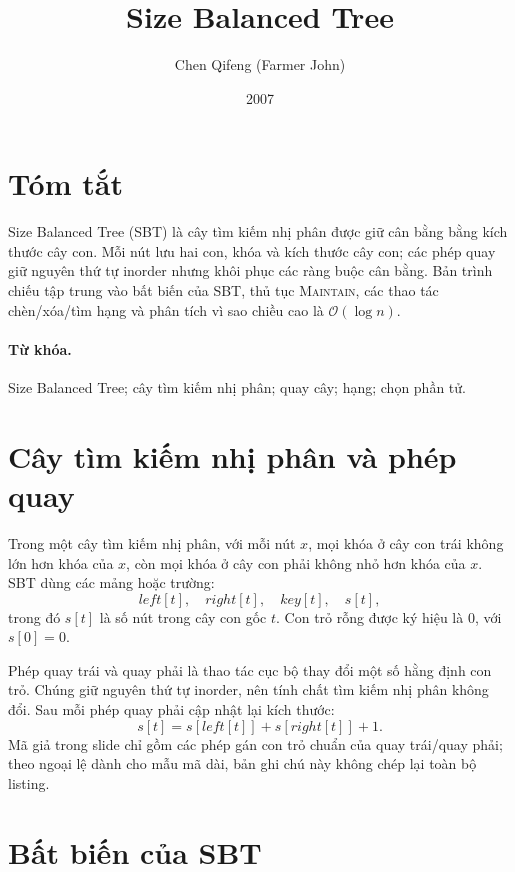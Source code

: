 \documentclass[11pt]{article}
\title{Size Balanced Tree}
\author{Chen Qifeng (Farmer John)}
\date{2007}
\newcommand{\Oh}{\mathcal{O}}
\begin{document}
\maketitle


\section*{Tóm tắt}

Size Balanced Tree (SBT) là cây tìm kiếm nhị phân được giữ cân bằng bằng kích
thước cây con. Mỗi nút lưu hai con, khóa và kích thước cây con; các phép quay
giữ nguyên thứ tự inorder nhưng khôi phục các ràng buộc cân bằng. Bản trình
chiếu tập trung vào bất biến của SBT, thủ tục \textsc{Maintain}, các thao tác
chèn/xóa/tìm hạng và phân tích vì sao chiều cao là \(\Oh(\log n)\).

\paragraph{Từ khóa.}
Size Balanced Tree; cây tìm kiếm nhị phân; quay cây; hạng; chọn phần tử.

\section{Cây tìm kiếm nhị phân và phép quay}

Trong một cây tìm kiếm nhị phân, với mỗi nút \(x\), mọi khóa ở cây con trái
không lớn hơn khóa của \(x\), còn mọi khóa ở cây con phải không nhỏ hơn khóa
của \(x\). SBT dùng các mảng hoặc trường:
\[
  \mathit{left}[t],\quad \mathit{right}[t],\quad \mathit{key}[t],\quad s[t],
\]
trong đó \(s[t]\) là số nút trong cây con gốc \(t\). Con trỏ rỗng được ký
hiệu là \(0\), với \(s[0]=0\).

Phép quay trái và quay phải là thao tác cục bộ thay đổi một số hằng định con
trỏ. Chúng giữ nguyên thứ tự inorder, nên tính chất tìm kiếm nhị phân không
đổi. Sau mỗi phép quay phải cập nhật lại kích thước:
\[
  s[t]=s[\mathit{left}[t]]+s[\mathit{right}[t]]+1.
\]
Mã giả trong slide chỉ gồm các phép gán con trỏ chuẩn của quay trái/quay
phải; theo ngoại lệ dành cho mẫu mã dài, bản ghi chú này không chép lại toàn
bộ listing.

\section{Bất biến của SBT}
\end{document}

